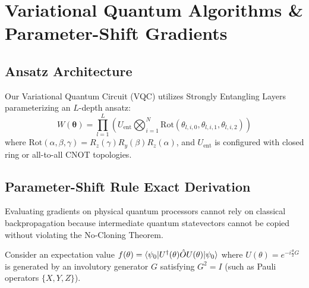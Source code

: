 \section{Variational Quantum Algorithms \& Parameter-Shift Gradients}
\label{sec:vqc}

\subsection{Ansatz Architecture}
Our Variational Quantum Circuit (VQC) utilizes Strongly Entangling Layers parameterizing an $L$-depth ansatz:
\begin{equation}
    W(\boldsymbol{\theta}) = \prod_{l=1}^L \left( U_{\text{ent}} \bigotimes_{i=1}^N \mathrm{Rot}(\theta_{l,i,0}, \theta_{l,i,1}, \theta_{l,i,2}) \right)
\end{equation}
where $\mathrm{Rot}(\alpha, \beta, \gamma) = R_z(\gamma) R_y(\beta) R_z(\alpha)$, and $U_{\text{ent}}$ is configured with closed ring or all-to-all CNOT topologies.

\subsection{Parameter-Shift Rule Exact Derivation}
\label{subsec:param_shift}
Evaluating gradients on physical quantum processors cannot rely on classical backpropagation because intermediate quantum statevectors cannot be copied without violating the No-Cloning Theorem.

Consider an expectation value $f(\theta) = \braket{\psi_0 | U^\dagger(\theta) \hat{O} U(\theta) | \psi_0}$ where $U(\theta) = e^{-i \frac{\theta}{2} G}$ is generated by an involutory generator $G$ satisfying $G^2 = I$ (such as Pauli operators $\{X, Y, Z\}$).

